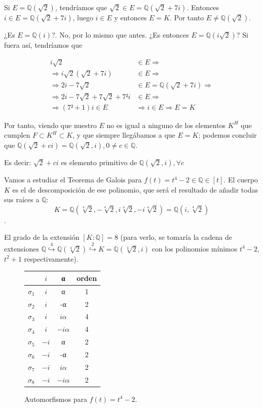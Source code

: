 \documentclass{apuntes}
\begin{document}
\begin{example}
Si $E = ℚ(\sqrt{2})$, tendríamos que $\sqrt{2} ∈ E = ℚ(\sqrt{2} + 7i)$. Entonces $i ∈ E = ℚ(\sqrt{2} + 7i)$, luego $i ∈ E$ y entonces $E = K$. Por tanto $E ≠ ℚ(\sqrt{2})$.

¿Es $E = ℚ(i)$?. No, por lo mismo que antes. ¿Es entonces $E = ℚ(i\sqrt{2})$? Si fuera así, tendríamos que

\begin{align*}
i\sqrt{2} &∈ E \Rightarrow \\
\Rightarrow i\sqrt{2} (\sqrt{2} + 7i) &∈ E \Rightarrow \\
\Rightarrow 2i - 7\sqrt{2} &∈ E = ℚ(\sqrt{2} + 7i) \Rightarrow \\
\Rightarrow 2i - 7\sqrt{2} + 7\sqrt{2} + 7²i &∈ E \Rightarrow \\
\Rightarrow (7²+1)i ∈ E &\Rightarrow i ∈ E \Rightarrow E = K
\end{align*}

Por tanto, viendo que nuestro $E$ no es igual a ninguno de los elementos $K^H$ que cumplen $F \subset K^H \subset K$, y que siempre llegábamos a que $E=K$; podemos concluir que $ℚ(\sqrt{2} + ci) = ℚ(\sqrt{2}, i), 0 ≠ c ∈ ℚ$.

Es decir: $\sqrt{2} + ci$ es elemento primitivo de $ℚ(\sqrt{2}, i), ∀c$
\end{example}

Vamos a estudiar el Teorema de Galois para $f(t) = t^4 - 2 ∈ ℚ∈[t]$. El cuerpo $K$ es el de descomposición de ese polinomio, que será el resultado de añadir todas sus raíces a $ℚ$: \[ K = ℚ(\sqrt[4]{2}, -\sqrt[4]{2}, i\sqrt[4]{2}, -i\sqrt[4]{2}) = ℚ(i, \sqrt[4]{2}) \].

El grado de la extensión $[K:ℚ] = 8$ (para verlo, se tomaría la cadena de extensiones $ℚ \stackrel{4}{\hookrightarrow} ℚ(\sqrt[4]{2}) \stackrel{2}{\hookrightarrow} K = ℚ(\sqrt[4]{2}, i)$ con los polinomios mínimos $t^4 -2 $, $t^2+1$ respectivamente).

\begin{figure}
\centering
\begin{tabular}{r|c|c|c}
$\;$  & $i$ & α & orden\\\hline
$σ_1$ & $i$ &  α & 1 \\
$σ_2$ & $i$ & -α & 2 \\
$σ_3$ & $i$ & $iα$ & 4\\
$σ_4$ & $i$ & $-iα$ & 4\\\hline
$σ_5$ & $-i$ & α & 2\\
$σ_6$ & $-i$ & -α & 2\\
$σ_7$ & $-i$ & $iα$ & 2\\
$σ_8$ & $-i$ & $-iα$ & 2 \\
\end{tabular}
\caption{Automorfismos para $f(t) = t^4 - 2$.}
\label{tblGaloisT4-2}
\end{figure}
\end{document}
